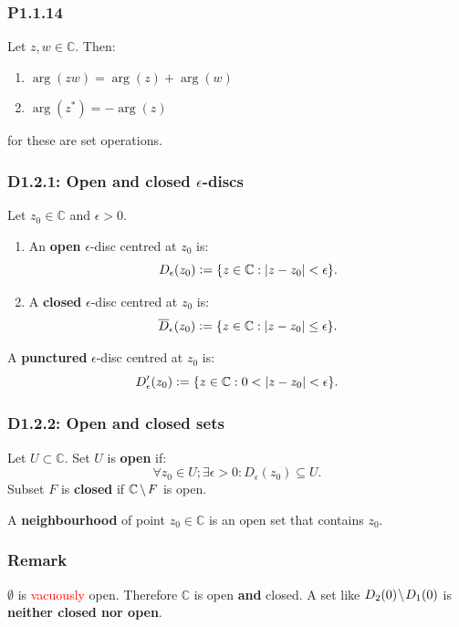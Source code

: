 \documentclass{article}
\newcommand{\deq}{\vcentcolon=}
\begin{document}
\begin{multicols*}{3}
\subsubsection*{P1.1.14}
Let $z,w\in\mathbb{C}$. Then:
\begin{enumerate}
    \item $\arg(zw)=\arg(z)+\arg(w)$
    
    \item $\arg(z^*)=-\arg(z)$
\end{enumerate}
for these are set operations.

\subsubsection*{D1.2.1: Open and closed $\epsilon$-discs}
Let $z_0\in\mathbb{C}$ and $\epsilon>0$.
\begin{enumerate}
    \item An \textbf{open} $\epsilon$-disc
    centred at $z_0$ is:
    $$D_{\epsilon}(z_0)
    \deq\{z\in\mathbb{C}:|z-z_0|<\epsilon\}.$$

    \item A \textbf{closed} $\epsilon$-disc
    centred at $z_0$ is:
    $$\overline{D}_{\epsilon}(z_0)
    \deq\{z\in\mathbb{C}:|z-z_0|\leq\epsilon\}.$$
\end{enumerate}
A \textbf{punctured} $\epsilon$-disc centred at $z_0$ is:
$$D'_{\epsilon}(z_0)\deq\{z\in\mathbb{C}:0<|z-z_0|<\epsilon\}.$$

\subsubsection*{D1.2.2: Open and closed sets}
Let $U\subset\mathbb{C}$. Set $U$ is \textbf{open} if:
$$\forall z_0\in U;\exists\epsilon>0:D_{\epsilon}(z_0)\subseteq U.$$
Subset $F$ is \textbf{closed} if
$\mathbb{C}\hspace{0.02in}\backslash\hspace{0.02in} F$ is open.

A \textbf{neighbourhood} of point $z_0\in\mathbb{C}$
is an open set that contains $z_0$.

\subsubsection*{Remark}
$\emptyset$ is \textcolor{red}{vacuously} open.
Therefore $\mathbb{C}$
is open \textbf{and} closed.
A set
like $D_2(0)\hspace{0.01in}\backslash\hspace{0.01in}
D_1(0)$
is \textbf{neither closed nor open}.


\end{multicols*}
\end{document}
